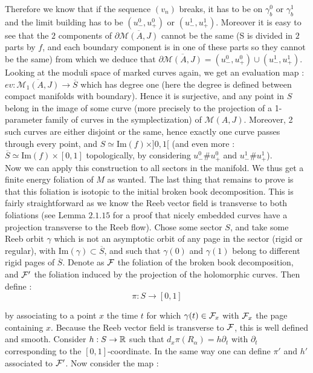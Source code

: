 \documentclass[../main.tex]{subfiles}
\begin{document}
Therefore we know that if the sequence $(v_n)$ breaks, it has to be on $\gamma_b^0$ or $\gamma_b^1$ and the limit building has to be $(u_-^0,u_+^0)$ or $(u_-^1,u_+^1)$. Moreover it is easy to see that the $2$ components of $\partial\overline{\mathcal{M}(A,J)}$ cannot be the same (S is divided in $2$ parts by $f$, and each boundary component is in one of these parts so they cannot be the same) from which we deduce that $\partial\overline{\mathcal{M}(A,J)} = (u_-^0,u_+^0)\cup(u_-^1,u_+^1)$. \\

Looking at the moduli space of marked curves again, we get an evaluation map : $ev :\overline{\mathcal{M}_1(A,J)}\rightarrow \overline{S}$ which has degree one (here the degree is defined between compact manifolds with boundary). Hence it is surjective, and any point in $S$ belong in the image of some curve (more precisely to the projection of a 1-parameter family of curves in the symplectization) of $\mathcal{M}(A,J)$. Moreover, 2 such curves are either disjoint or the same, hence exactly one curve passes through every point, and $S\simeq \text{Im}(f)\times ]0,1[$ (and even more : $\overline{S} \simeq \text{Im}(f)\times [0,1]$ topologically, by considering $u_-^0\#u_+^0$ and $u_-^1\#u_+^1$). \\

Now we can apply this construction to all sectors in the manifold. We thus get a finite energy foliation of $M$ as wanted. The last thing that remains to prove is that this foliation is isotopic to the initial broken book decomposition. This is fairly straightforward as we know the Reeb vector field is transverse to both foliations (see \cite{cioba_nicely_nodate} Lemma $2.1.15$ for a proof that nicely embedded curves have a projection transverse to the Reeb flow). Chose some sector $S$, and take some Reeb orbit $\gamma$ which is not an asymptotic orbit of any page in the sector (rigid or regular), with $\text{Im}(\gamma)\subset \overline{S}$, and such that $\gamma(0)$ and $\gamma(1)$ belong to different rigid pages of $\overline{S}$. Denote as $\mathcal{F}$ the foliation of the broken book decomposition, and $\mathcal{F}'$ the foliation induced by the projection of the holomorphic curves. Then define : 
$$\pi : S \rightarrow [0,1]$$

\noindent by associating to a point $x$ the time $t$ for which $\gamma(t) \in \mathcal{F}_x$ with $\mathcal{F}_x$ the page containing $x$. Because the Reeb vector field is transverse to $\mathcal{F}$, this is well defined and smooth. Consider $h : S \rightarrow \mathbb{R}$ such that $d_x\pi(R_\alpha) = h\partial_t$ with $\partial_t$ corresponding to the $[0,1]$-coordinate. In the same way one can define $\pi'$ and $h'$ associated to $\mathcal{F} '$. Now consider the map :  
\end{document}
